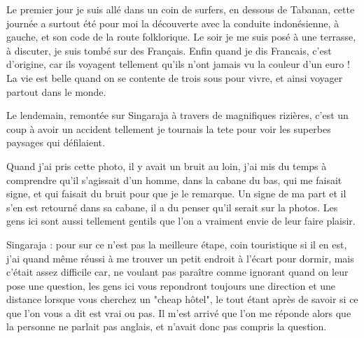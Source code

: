 \begin{multicols}{2}
Le premier jour je suis allé dans un coin de surfers, en dessous de Tabanan, cette journée a surtout été pour moi la découverte avec la conduite indonésienne, à gauche, et son code de la route folklorique. Le soir je me suis posé à une terrasse, à discuter, je suis tombé sur des Français. Enfin quand je dis Francais, c'est d'origine, car ils voyagent tellement qu'ils n'ont jamais vu la couleur d'un euro ! La vie est belle quand on se contente de trois sous pour vivre, et ainsi voyager partout dans le monde.

Le lendemain, remontée sur Singaraja à travers de magnifiques rizières, c'est un coup à avoir un accident tellement je tournais la tete pour voir les superbes paysages qui défilaient.








Quand j'ai pris cette photo, il y avait un bruit au loin, j'ai mis du temps à comprendre qu'il s'agissait d'un homme, dans la cabane du bas, qui me faisait signe, et qui faisait du bruit pour que je le remarque. Un signe de ma part et il s'en est retourné dans sa cabane, il a du penser qu'il serait sur la photos. Les gens ici sont aussi tellement gentils que l'on a vraiment envie de leur faire plaisir.

Singaraja : pour sur ce n'est pas la meilleure étape, coin touristique si il en est, j'ai quand même réussi à me trouver un petit endroit à l'écart pour dormir, mais c'était assez difficile car, ne voulant pas paraître comme ignorant quand on leur pose une question, les gens ici vous repondront toujours une direction et une distance lorsque vous cherchez un "cheap hôtel", le tout étant après de savoir si ce que l'on vous a dit est vrai ou pas. Il m'est arrivé que l'on me réponde alors que la personne ne parlait pas anglais, et n'avait donc pas compris la question.


\end{multicols}
